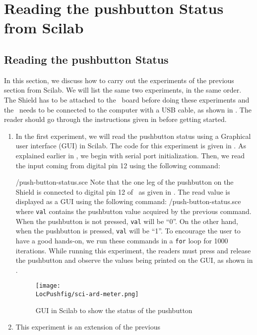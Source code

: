 \section{Reading the pushbutton Status from Scilab}
\subsection{Reading the pushbutton Status}
In this section, we discuss how to carry out the experiments of the
previous section from Scilab. We will list the same two experiments,
in the same order.  The Shield has to be attached to the \arduino\ board
before doing these experiments and the \arduino\ needs to be connected to the computer 
with a USB cable, as shown in .
The reader should go through the instructions given in
 before getting started. 
\begin{enumerate}
\item In the first experiment, we will read the pushbutton status using a 
Graphical user interface (GUI) in Scilab. The code for this experiment is 
given in  . As explained earlier in , 
we begin with serial port initialization. Then, we read the input coming from
digital pin 12 using the following command: 
  
  {\LocPushscicode/push-button-status.sce} Note that the one leg of the pushbutton on
  the Shield is connected to digital pin 12 of \arduino\, 
  as given in . The read value is displayed as a GUI using
  the following command: 
  {\LocPushscicode/push-button-status.sce} where {\tt val} contains
  the pushbutton value acquired by the previous command.
  When the pushbutton is not pressed, {\tt val} will be ``0''. On the other hand,
  when the pushbutton is pressed, {\tt val} will be ``1''. To
  encourage the user to have a good hands-on, we run these commands in
  a {\tt for} loop for 1000 iterations. While running this experiment, 
  the readers must press and release the pushbutton and observe the values being printed on the
  GUI, as shown in .
 \begin{figure}
    \centering
    \texttt{[image: \\LocPushfig/sci-ard-meter.png]}
    \caption{GUI in Scilab to show the status of the pushbutton}
    \label{fig:ard-meter}
  \end{figure}
\item This experiment is an extension of the previous

\end{enumerate}
